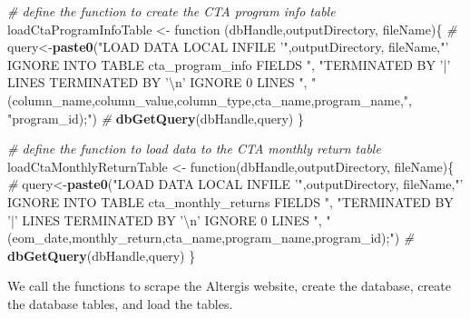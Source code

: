 \documentclass[]{article}
\newenvironment{Shaded}{\begin{snugshade}}{\end{snugshade}}
\newcommand{\KeywordTok}[1]{\textcolor[rgb]{0.13,0.29,0.53}{\textbf{{#1}}}}
\newcommand{\CharTok}[1]{\textcolor[rgb]{0.31,0.60,0.02}{{#1}}}
\newcommand{\StringTok}[1]{\textcolor[rgb]{0.31,0.60,0.02}{{#1}}}
\newcommand{\CommentTok}[1]{\textcolor[rgb]{0.56,0.35,0.01}{\textit{{#1}}}}
\newcommand{\NormalTok}[1]{{#1}}
\begin{document}
\begin{Shaded}
\begin{Highlighting}[]
\CommentTok{# define the function to create the CTA program info table}
\NormalTok{loadCtaProgramInfoTable <-}\StringTok{ }\NormalTok{function (dbHandle,outputDirectory,}
                                     \NormalTok{fileName)\{}
  \CommentTok{#}
  \NormalTok{query<-}\KeywordTok{paste0}\NormalTok{(}\StringTok{"LOAD DATA LOCAL INFILE '"}\NormalTok{,outputDirectory,}
                \NormalTok{fileName,}\StringTok{"' IGNORE INTO TABLE cta_program_info FIELDS "}\NormalTok{,}
                \StringTok{"TERMINATED BY '|' LINES TERMINATED BY '}\CharTok{\textbackslash{}n}\StringTok{' IGNORE 0 LINES "}\NormalTok{,}
                \StringTok{"(column_name,column_value,column_type,cta_name,program_name,"}\NormalTok{,}
                \StringTok{"program_id);"}\NormalTok{)}
  \CommentTok{#}
  \KeywordTok{dbGetQuery}\NormalTok{(dbHandle,query)}
\NormalTok{\}}

\CommentTok{# define the function to load data to the CTA monthly return table}
\NormalTok{loadCtaMonthlyReturnTable <-}\StringTok{ }\NormalTok{function(dbHandle,outputDirectory,}
                                      \NormalTok{fileName)\{}
  \CommentTok{#}
  \NormalTok{query<-}\KeywordTok{paste0}\NormalTok{(}\StringTok{"LOAD DATA LOCAL INFILE '"}\NormalTok{,outputDirectory,}
                \NormalTok{fileName,}\StringTok{"' IGNORE INTO TABLE cta_monthly_returns FIELDS "}\NormalTok{,}
                \StringTok{"TERMINATED BY '|' LINES TERMINATED BY '}\CharTok{\textbackslash{}n}\StringTok{' IGNORE 0 LINES "}\NormalTok{,}
                \StringTok{"(eom_date,monthly_return,cta_name,program_name,program_id);"}\NormalTok{)}
  \CommentTok{#}
  \KeywordTok{dbGetQuery}\NormalTok{(dbHandle,query)}
\NormalTok{\}}
\end{Highlighting}
\end{Shaded}

We call the functions to scrape the Altergis website, create the
database, create the database tables, and load the tables.
\end{document}
